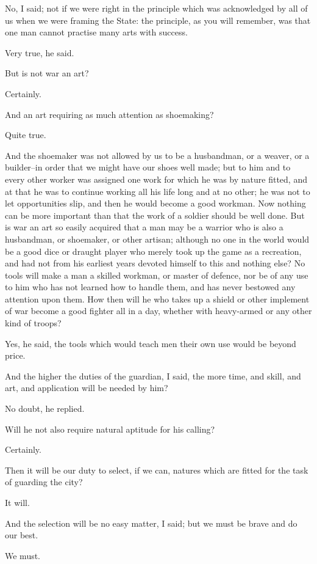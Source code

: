 No, I said; not if we were right in the principle which was acknowledged
by all of us when we were framing the State: the principle, as you will
remember, was that one man cannot practise many arts with success.

Very true, he said.

But is not war an art?

Certainly.

And an art requiring as much attention as shoemaking?

Quite true.

And the shoemaker was not allowed by us to be a husbandman, or a weaver,
or a builder--in order that we might have our shoes well made; but to
him and to every other worker was assigned one work for which he was by
nature fitted, and at that he was to continue working all his life long
and at no other; he was not to let opportunities slip, and then he would
become a good workman. Now nothing can be more important than that
the work of a soldier should be well done. But is war an art so easily
acquired that a man may be a warrior who is also a husbandman, or
shoemaker, or other artisan; although no one in the world would be a
good dice or draught player who merely took up the game as a recreation,
and had not from his earliest years devoted himself to this and nothing
else? No tools will make a man a skilled workman, or master of defence,
nor be of any use to him who has not learned how to handle them, and has
never bestowed any attention upon them. How then will he who takes up
a shield or other implement of war become a good fighter all in a day,
whether with heavy-armed or any other kind of troops?

Yes, he said, the tools which would teach men their own use would be
beyond price.

And the higher the duties of the guardian, I said, the more time, and
skill, and art, and application will be needed by him?

No doubt, he replied.

Will he not also require natural aptitude for his calling?

Certainly.

Then it will be our duty to select, if we can, natures which are fitted
for the task of guarding the city?

It will.

And the selection will be no easy matter, I said; but we must be brave
and do our best.

We must.

